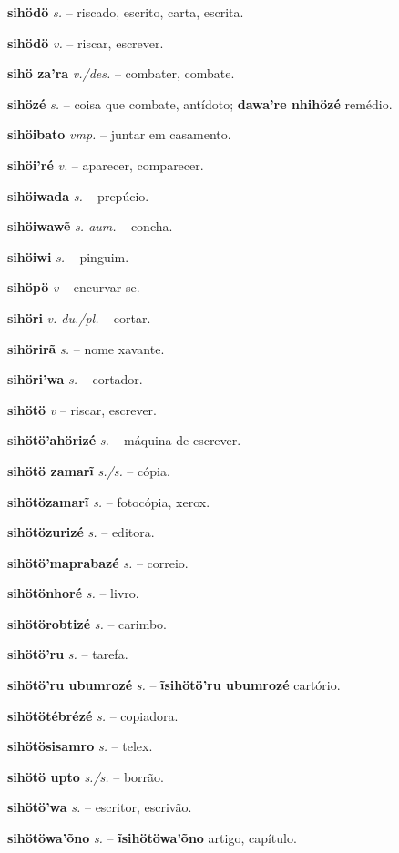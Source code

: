 \textbf{sihödö} \textit{s.} -- riscado, escrito, carta, escrita.

\textbf{sihödö} \textit{v.} -- riscar, escrever.

\textbf{sihö za'ra} \textit{v./des.} -- combater, combate.

\textbf{sihözé} \textit{s.} -- coisa que combate, antídoto; \textbf{dawa're nhihözé} remédio.

\textbf{sihöibato} \textit{vmp.} -- juntar em casamento.

\textbf{sihöi'ré} \textit{v.} -- aparecer, comparecer.

\textbf{sihöiwada} \textit{s.} -- prepúcio.

\textbf{sihöiwawẽ} \textit{s. aum.} -- concha.

\textbf{sihöiwi} \textit{s.} -- pinguim.

\textbf{sihöpö} \textit{v} -- encurvar-se.

\textbf{sihöri} \textit{v. du./pl.} -- cortar.

\textbf{sihörirã} \textit{s.} -- nome xavante.

\textbf{sihöri'wa} \textit{s.} -- cortador.

\textbf{sihötö} \textit{v} -- riscar, escrever.

\textbf{sihötö'ahörizé} \textit{s.} -- máquina de escrever.

\textbf{sihötö zamarĩ} \textit{s./s.} -- cópia.

\textbf{sihötözamarĩ} \textit{s.} -- fotocópia, xerox.

\textbf{sihötözurizé} \textit{s.} -- editora.

\textbf{sihötö'maprabazé} \textit{s.} -- correio.

\textbf{sihötönhoré} \textit{s.} -- livro.

\textbf{sihötörobtizé} \textit{s.} -- carimbo.

\textbf{sihötö'ru} \textit{s.} -- tarefa.

\textbf{sihötö'ru ubumrozé} \textit{s.} -- \textbf{ĩsihötö'ru ubumrozé} cartório.

\textbf{sihötötébrézé} \textit{s.} -- copiadora.

\textbf{sihötösisamro} \textit{s.} -- telex.

\textbf{sihötö upto} \textit{s./s.} -- borrão.

\textbf{sihötö'wa} \textit{s.} -- escritor, escrivão.

\textbf{sihötöwa'õno} \textit{s.} -- \textbf{ĩsihötöwa'õno} artigo, capítulo.

